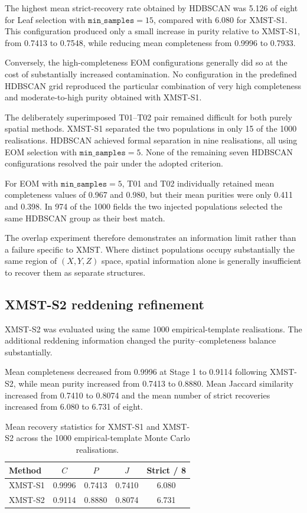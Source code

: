 \documentclass[fleqn,usenatbib]{rasti}
\begin{document}
The highest mean strict-recovery rate obtained by HDBSCAN was 5.126 of
eight for Leaf selection with $\texttt{min\_samples}=15$, compared with
6.080 for XMST-S1. This configuration produced only a small increase in
purity relative to XMST-S1, from 0.7413 to 0.7548, while reducing mean
completeness from 0.9996 to 0.7933.

Conversely, the high-completeness EOM configurations generally did so at the
cost of substantially increased contamination. No configuration in the
predefined HDBSCAN grid reproduced the particular combination of very high
completeness and moderate-to-high purity obtained with XMST-S1.

The deliberately superimposed T01--T02 pair remained difficult for both
purely spatial methods. XMST-S1 separated the two populations in only
15 of the 1000 realisations. HDBSCAN achieved formal separation in nine
realisations, all using EOM selection with
$\texttt{min\_samples}=5$. None of the remaining seven HDBSCAN
configurations resolved the pair under the adopted criterion.

For EOM with $\texttt{min\_samples}=5$, T01 and T02 individually retained
mean completeness values of 0.967 and 0.980, but their mean purities were
only 0.411 and 0.398. In 974 of the 1000 fields the two injected
populations selected the same HDBSCAN group as their best match.

The overlap experiment therefore demonstrates an information limit rather
than a failure specific to XMST. Where distinct populations occupy
substantially the same region of $(X,Y,Z)$ space, spatial information alone
is generally insufficient to recover them as separate structures.


\subsection{XMST-S2 reddening refinement}

XMST-S2 was evaluated using the same 1000 empirical-template realisations.
The additional reddening information changed the purity--completeness balance
substantially.

Mean completeness decreased from 0.9996 at Stage 1 to 0.9114 following
XMST-S2, while mean purity increased from 0.7413 to 0.8880. Mean Jaccard
similarity increased from 0.7410 to 0.8074 and the mean number of strict
recoveries increased from 6.080 to 6.731 of eight.

\begin{table}
\centering
\caption{Mean recovery statistics for XMST-S1 and XMST-S2 across the
1000 empirical-template Monte Carlo realisations.}
\label{tab:s2_mc}
\begin{tabular}{lcccc}
\hline
Method & $C$ & $P$ & $J$ & Strict / 8 \\
\hline
XMST-S1 & 0.9996 & 0.7413 & 0.7410 & 6.080 \\
XMST-S2 & 0.9114 & 0.8880 & 0.8074 & 6.731 \\
\hline
\end{tabular}
\end{table}
\end{document}
